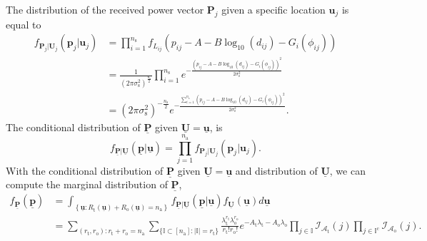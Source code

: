 The distribution of the received power vector $\mathbf{P}_j$ given a specific location $\mathbf{u}_j$ is equal to
\begin{equation} 
\begin{split}
f_{\mathbf{P}_j | \mathbf{U}_j} (\mathbf{p}_{j} | \mathbf{u}_j)
&= \prod_{i=1}^{n_{\mathrm{s}}}
f_{L_{ij}} ( p_{ij} - A - B \log_{10} (d_{ij}) - G_i(\phi_{ij}) ) \\
&= \frac{1}{\left( 2 \pi \sigma_{\mathrm{s}}^2 \right)^{\frac{n_{\mathrm{s}}}{2} }}
\prod_{i=1}^{n_{\mathrm{s}}} e^{- \frac{( p_{ij} - A - B \log_{10} (d_{ij}) - G_i(\phi_{ij}) )^2}{2 \sigma_{\mathrm{s}}^2} } \\
&= \left( 2 \pi \sigma_{\mathrm{s}}^2 \right)^{- \frac{n_{\mathrm{s}}}{2}}
e^{- \frac{ \sum_{i=1}^{n_{\mathrm{s}}}
		(p_{ij} - A - B \log_{10} (d_{ij}) - G_i(\phi_{ij}))^2}
	{2 \sigma_{\mathrm{s}}^2}} .
\end{split}
\end{equation}
The conditional distribution of $\underline{\mathbf{P}}$ given $\underline{\mathbf{U}}=\underline{\mathbf{u}}$, is
\begin{equation} \label{equation:CondDistP}
f_{\underline{\mathbf{P}} | \underline{\mathbf{U}}}
\left( \underline{\mathbf{p}} | \underline{\mathbf{u}} \right)
= \prod_{j=1}^{n_{\mathrm{a}}}
f_{\mathbf{P}_j | \mathbf{U}_j} (\mathbf{p}_{j}|\mathbf{u}_j) .
\end{equation}
With the conditional distribution of $\underline{\mathbf{P}}$ given $\underline{\mathbf{U}}=\underline{\mathbf{u}}$ and distribution of $\underline{\mathbf{U}}$, we can compute the marginal distribution of $\underline{\mathbf{P}}$,
\begin{equation} \label{equation:MarginalDistP}
\begin{split}
f_{\underline{\mathbf{P}}} \left( \underline{\mathbf{p}} \right)
&= \int_{ \left\{ \underline{\mathbf{u}}
	: R_{\mathrm{t}}(\underline{\mathbf{u}}) 
	+ R_{\mathrm{o}}(\underline{\mathbf{u}}) = n_{\mathrm{a}} \right\} }
f_{\underline{\mathbf{P}} | \underline{\mathbf{U}}}
\left( \underline{\mathbf{p}} | \underline{\mathbf{u}} \right)
f_{\underline{\mathbf{U}}}(\underline{\mathbf{u}})
d\underline{\mathbf{u}} \\
&= \sum_{(r_{\mathrm{t}}, r_{\mathrm{o}}) :
	r_{\mathrm{t}} + r_{\mathrm{o}} = n_{\mathrm{a}}}
\sum_{\{ \mathbb{I} \subset [n_{\mathrm{a}}]
	: |\mathbb{I}| = r_{\mathrm{t}} \}}
\frac{\lambda_{\mathrm{t}}^{r_{\mathrm{t}}}
	\lambda_{\mathrm{o}}^{r_{\mathrm{o}}}}
{r_{\mathrm{t}}! r_{\mathrm{o}}!}
e^{- A_{\mathrm{t}} \lambda_{\mathrm{t}}
	- A_{\mathrm{o}} \lambda_{\mathrm{o}}}
\prod_{j \in \mathbb{I}} \mathcal{I}_{\mathcal{A}_{\mathrm{t}}}(j)
\prod_{j \in \mathbb{I}^{\mathrm{c}}}
\mathcal{I}_{\mathcal{A}_{\mathrm{o}}}(j) .
\end{split}
\end{equation}
